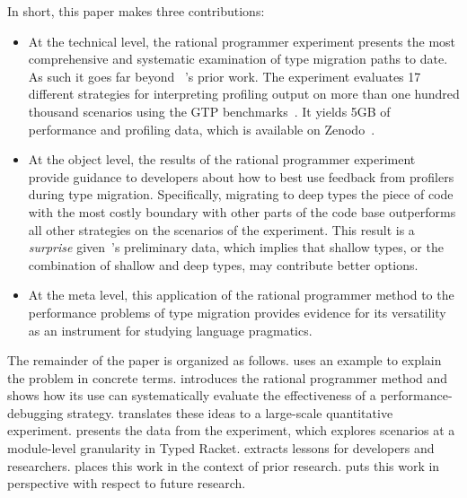 In short, this paper makes three contributions:
\begin{itemize}

\item At the technical level, the rational programmer experiment presents
  the most comprehensive and systematic examination of type migration
    paths to date.    As such it goes far beyond ~\citet{g-deep-shallow}'s 
    prior work.  The experiment evaluates 17 different strategies for
    interpreting profiling output on  more than one hundred thousand scenarios using the GTP
    benchmarks~\cite{g-rep-2023}. It yields
     5GB of performance and profiling data, which
    is available on
    Zenodo~\cite{gdf-artifact-2023}.
  
\item At the object level, the results of the rational programmer
  experiment provide guidance to developers about how to best use feedback
    from profilers during type migration. Specifically, 
    migrating to deep types the piece of code with the most costly
    boundary with other parts of the code base
    outperforms all other  strategies on the scenarios of
    the experiment. This result is a \emph{surprise} given~\citet{g-deep-shallow}'s
    preliminary data, which implies that shallow types, or the combination of shallow and deep
    types, may contribute better options. 

\item At the meta level, this application of the rational programmer method to
 the performance problems of type migration provides evidence for its versatility
 as an instrument for studying language pragmatics.

\end{itemize}
The remainder of the paper is organized as follows.  
uses an example to explain the problem in concrete terms. 
introduces the rational programmer method and shows how its use can systematically
evaluate the effectiveness of a performance-debugging strategy.
 translates these ideas to a
large-scale quantitative experiment.
 presents the data from the experiment, which
explores scenarios at a module-level granularity in Typed Racket.
 extracts lessons for developers and researchers.
 places this work in the context of prior research.
 puts this work in perspective with respect to future
research.
